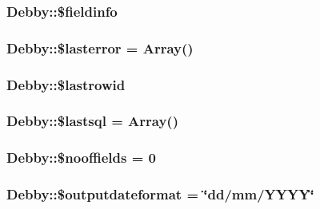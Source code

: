\subsubsection[{\$fieldinfo}]{\setlength{\rightskip}{0pt plus 5cm}Debby\+::\$fieldinfo}\label{classDebby_a7d54dc610647753b09fd501ee0b65f54}
\hypertarget{classDebby_ab74aec371d05b763d7c8123b80621c3d}{}
\subsubsection[{\$lasterror}]{\setlength{\rightskip}{0pt plus 5cm}Debby\+::\$lasterror = Array()}\label{classDebby_ab74aec371d05b763d7c8123b80621c3d}
\hypertarget{classDebby_af86fbd6343eccc180f84e816627a5a91}{}
\subsubsection[{\$lastrowid}]{\setlength{\rightskip}{0pt plus 5cm}Debby\+::\$lastrowid}\label{classDebby_af86fbd6343eccc180f84e816627a5a91}
\hypertarget{classDebby_ae609a3e9058918214dbac27c36381323}{}
\subsubsection[{\$lastsql}]{\setlength{\rightskip}{0pt plus 5cm}Debby\+::\$lastsql = Array()}\label{classDebby_ae609a3e9058918214dbac27c36381323}
\hypertarget{classDebby_a72634c1e21e0f68c5a69e6a1db478ff5}{}
\subsubsection[{\$nooffields}]{\setlength{\rightskip}{0pt plus 5cm}Debby\+::\$nooffields = 0}\label{classDebby_a72634c1e21e0f68c5a69e6a1db478ff5}
\hypertarget{classDebby_a708fea658eab39aad196703f8b8aaa18}{}
\subsubsection[{\$outputdateformat}]{\setlength{\rightskip}{0pt plus 5cm}Debby\+::\$outputdateformat = \char`\"{}dd/mm/Y\+Y\+Y\+Y\char`\"{}}\label{classDebby_a708fea658eab39aad196703f8b8aaa18}
\hypertarget{classDebby_a462ad03fefee05b5f763469f8bb5abfc}{}
